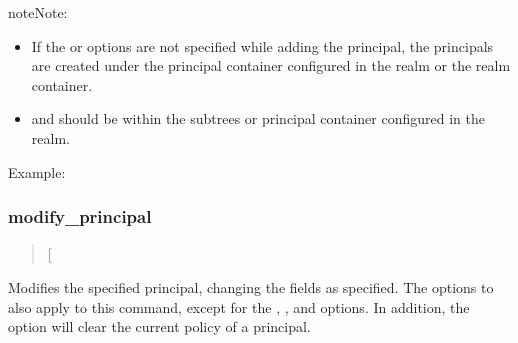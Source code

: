 \documentclass[letterpaper,10pt,english]{sphinxmanual}
\begin{document}
\begin{description}
\begin{sphinxadmonition}{note}{Note:}
\begin{itemize}
\item {} 
\sphinxAtStartPar
If the  or  options are not specified while
adding the principal, the principals are created under the
principal container configured in the realm or the realm
container.

\item {} 
\sphinxAtStartPar
{} and  should be within the subtrees or
principal container configured in the realm.

\end{itemize}
\end{sphinxadmonition}

\end{description}

\sphinxAtStartPar
Example:

\begin{sphinxVerbatim}[commandchars=\\\{\}]
  
    
   
    
    
  
\end{sphinxVerbatim}


\subsubsection{modify\_principal}
\label{\detokenize{admin/admin_commands/kadmin_local:modify-principal}}\label{\detokenize{admin/admin_commands/kadmin_local:id2}}\begin{quote}

\sphinxAtStartPar
{} {[}\sphinxstyleemphasis{options}{]} 
\end{quote}

\sphinxAtStartPar
Modifies the specified principal, changing the fields as specified.
The options to  also apply to this command, except
for the , , and  options.  In addition, the
option  will clear the current policy of a principal.
\end{document}
